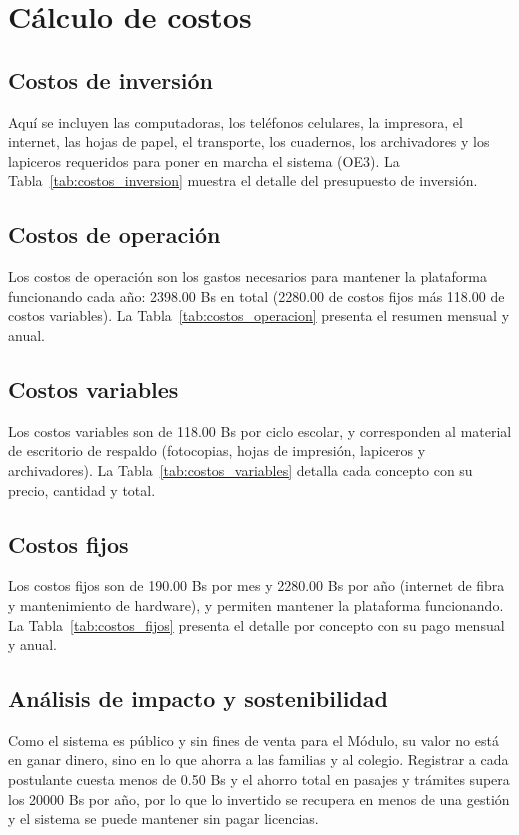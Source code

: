 \section{Cálculo de costos}
\label{sec:calculo_costos}

\subsection{Costos de inversión}

Aquí se incluyen las computadoras, los teléfonos celulares, la impresora, el internet, las hojas de papel, el transporte, los cuadernos, los archivadores y los lapiceros requeridos para poner en marcha el sistema (OE3). La Tabla~\ref{tab:costos_inversion} muestra el detalle del presupuesto de inversión.



\subsection{Costos de operación}

Los costos de operación son los gastos necesarios para mantener la plataforma funcionando cada año: 2398.00 Bs en total (2280.00 de costos fijos más 118.00 de costos variables). La Tabla~\ref{tab:costos_operacion} presenta el resumen mensual y anual.



\subsection{Costos variables}

Los costos variables son de 118.00 Bs por ciclo escolar, y corresponden al material de escritorio de respaldo (fotocopias, hojas de impresión, lapiceros y archivadores). La Tabla~\ref{tab:costos_variables} detalla cada concepto con su precio, cantidad y total.



\subsection{Costos fijos}

Los costos fijos son de 190.00 Bs por mes y 2280.00 Bs por año (internet de fibra y mantenimiento de hardware), y permiten mantener la plataforma funcionando. La Tabla~\ref{tab:costos_fijos} presenta el detalle por concepto con su pago mensual y anual.



\subsection{Análisis de impacto y sostenibilidad}

Como el sistema es público y sin fines de venta para el Módulo, su valor no está en ganar dinero, sino en lo que ahorra a las familias y al colegio. Registrar a cada postulante cuesta menos de 0.50 Bs y el ahorro total en pasajes y trámites supera los 20000 Bs por año, por lo que lo invertido se recupera en menos de una gestión y el sistema se puede mantener sin pagar licencias.
